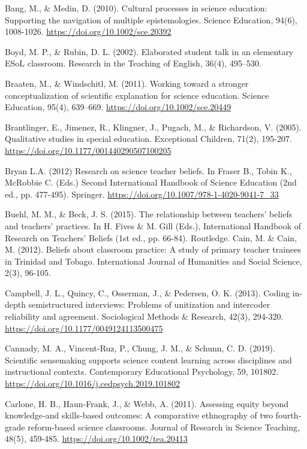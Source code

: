 \documentclass{sig-alternate} %
\begin{document}
Bang, M., \& Medin, D. (2010). Cultural processes in science education: Supporting the navigation of multiple epistemologies. Science Education, 94(6), 1008-1026. \url{https://doi.org/10.1002/sce.20392}

Boyd, M. P., \& Rubin, D. L. (2002). Elaborated student talk in an elementary ESoL classroom. Research in the Teaching of English, 36(4), 495–530.

Braaten, M., \& Windschitl, M. (2011). Working toward a stronger conceptualization of scientific explanation for science education. Science Education, 95(4), 639–669. \url{https://doi.org/10.1002/sce.20449}

Brantlinger, E., Jimenez, R., Klingner, J., Pugach, M., \& Richardson, V. (2005). Qualitative studies in special education. Exceptional Children, 71(2), 195-207. \url{https://doi.org/10.1177/001440290507100205} 

Bryan L.A. (2012) Research on science teacher beliefs. In Fraser B., Tobin K., McRobbie C. (Eds.) Second International Handbook of Science Education (2nd ed., pp. 477-495). Springer. \url{https://doi.org/10.1007/978-1-4020-9041-7_33} 

Buehl, M. M., \& Beck, J. S. (2015). The relationship between teachers’ beliefs and 	teachers’ practices. In H. Fives \& M. Gill (Eds.), International Handbook of Research on Teachers’ Beliefs (1st ed., pp. 66-84). Routledge.
\newpage
Cain, M. \& Cain, M. (2012). Beliefs about classroom practice: A study of primary teacher trainees in Trinidad and Tobago. International Journal of Humanities and Social Science, 2(3), 96-105.

Campbell, J. L., Quincy, C., Osserman, J., \& Pedersen, O. K. (2013). Coding in-depth semistructured interviews: Problems of unitization and intercoder reliability and agreement. Sociological Methods \& Research, 42(3), 294-320. \url{https://doi.org/10.1177/0049124113500475}

Cannady, M. A., Vincent-Ruz, P., Chung, J. M., \& Schunn, C. D. (2019). Scientific sensemaking supports science content learning across disciplines and instructional contexts. Contemporary Educational Psychology, 59, 101802. \url{https://doi.org/10.1016/j.cedpsych.2019.101802}

Carlone, H. B., Haun‐Frank, J., \& Webb, A. (2011). Assessing equity beyond knowledge‐and skills‐based outcomes: A comparative ethnography of two fourth‐grade reform‐based science classrooms. Journal of Research in Science Teaching, 48(5), 459-485. \url{https://doi.org/10.1002/tea.20413}
\end{document}
